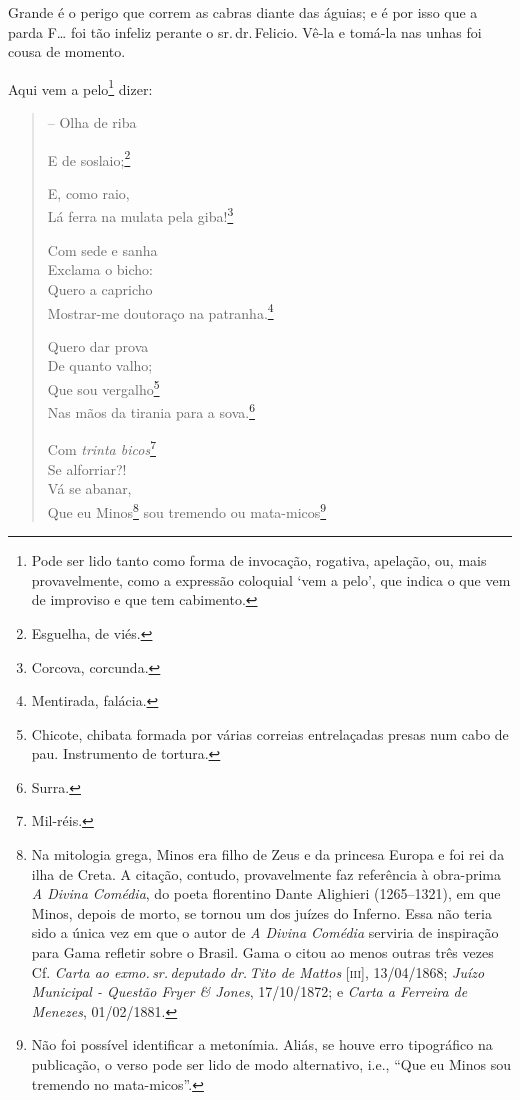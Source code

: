 Grande é o perigo que correm as cabras diante das águias; e é por isso
que a parda F\ldots{} foi tão infeliz perante o sr.\,dr.\,Felicio. Vê-la e
tomá-la nas unhas foi cousa de momento.

Aqui vem a pelo\footnote{ Pode ser lido tanto como forma de invocação,
  rogativa, apelação, ou, mais provavelmente, como a expressão coloquial
  `vem a pelo', que indica o que vem de improviso e que tem cabimento.}
dizer:

\begin{verse}
-- Olha de riba

E de soslaio;\footnote{ Esguelha, de viés.}

E, como raio,\\
Lá ferra na mulata pela giba!\footnote{ Corcova, corcunda.}

Com sede e sanha\\
Exclama o bicho:\\
Quero a capricho\\
Mostrar-me doutoraço na patranha.\footnote{ Mentirada, falácia.}

Quero dar prova\\
De quanto valho;\\
Que sou vergalho\footnote{Chicote, chibata formada por várias correias
  entrelaçadas presas num cabo de pau. Instrumento de tortura.}\\
Nas mãos da tirania para a sova.\footnote{ Surra.}

Com \emph{trinta bicos}\footnote{ Mil-réis.}\\
Se alforriar?!\\
Vá se abanar,\\
Que eu Minos\footnote{ Na mitologia grega, Minos era filho de Zeus e da
  princesa Europa e foi rei da ilha de Creta. A citação, contudo,
  provavelmente faz referência à obra-prima \emph{A Divina Comédia}, do
  poeta florentino Dante Alighieri (1265--1321), em que Minos, depois de
  morto, se tornou um dos juízes do Inferno. Essa não teria sido a única
  vez em que o autor de \emph{A Divina Comédia} serviria de inspiração
  para Gama refletir sobre o Brasil. Gama o citou ao menos outras três
  vezes Cf. \emph{Carta ao exmo.\,sr.\,deputado dr.\,Tito de Mattos}
  {[}\textsc{iii}{]}, 13/04/1868; \emph{Juízo Municipal - Questão Fryer \&
  Jones}, 17/10/1872; e \emph{Carta a Ferreira de Menezes}, 01/02/1881.}
sou tremendo ou mata-micos\footnote{ Não foi possível identificar a
  metonímia. Aliás, se houve erro tipográfico na publicação, o verso
  pode ser lido de modo alternativo, i.e., ``Que eu Minos sou tremendo no
  mata-micos''.}


\end{verse}

